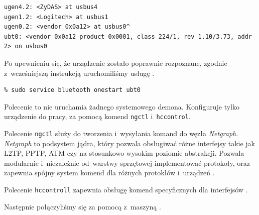 \begin{lstlisting}[caption={Potwierdzenie w logu systemowym, że urządzenie \bt{} zostało wykryte.}]
% dmesg | tail
ugen4.2: <ZyDAS> at usbus4
ugen1.2: <Logitech> at usbus1
ugen0.2: <vendor 0x0a12> at usbus0^
ubt0: <vendor 0x0a12 product 0x0001, class 224/1, rev 1.10/3.73, addr 2> on usbus0
\end{lstlisting}

Po upewnieniu się, że urządzenie zostało poprawnie rozpoznane, zgodnie
z~wcześniejszą instrukcją uruchomiliśmy usługę \bt.

\begin{lstlisting}
% sudo service bluetooth onestart ubt0
\end{lstlisting}

Polecenie to nie uruchamia żadnego systemowego demona. Konfiguruje tylko
urządzenie \bt do pracy, za pomocą komend \texttt{ngctl} i~\texttt{hccontrol}.

Polecenie \texttt{ngctl} służy do tworzenia i~wysyłania komand do węzła
\emph{Netgraph}. \emph{Netgraph} to podsystem jądra, który pozwala obsługiwać
różne interfejsy takie jak L2TP, PPTP, ATM czy \bt{} na stosunkowo wysokim
poziomie abstrakcji. Pozwala modularnie i~niezależnie od~warstwy sprzętowej
implementować protokoły, oraz zapewnia spójny system komend dla różnych
protokłów i~urządzeń \cite{man:netgraph}.

Polecenie \texttt{hccontroll} zapewnia obsługę komend specyficznych dla
interfejsów \bt.

Następnie połączyliśmy się za pomocą \bt{} z~maszyną \kosiem.

